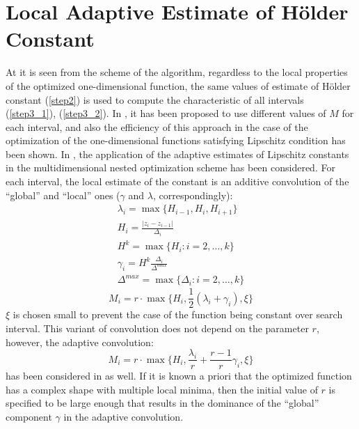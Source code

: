 \documentclass[procedia]{easychair}
\begin{document}
\section{Local Adaptive Estimate of Hölder Constant}
At it is seen from the scheme of the algorithm, regardless to the local properties
of the optimized one-dimensional function, the same values of estimate of Hölder
constant (\ref{step2}) is used to compute the characteristic of all intervals (\ref{step3_1}), (\ref{step3_2}).
In \cite{sergLocalTuning}, it has been proposed to use different values of \(M\) for each interval,
and also the efficiency of this approach in the case of the optimization of the
one-dimensional functions satisfying Lipschitz condition has been shown. In \cite{nestedLocal},
the application of the adaptive estimates of Lipschitz constants in the multidimensional
nested optimization scheme has been considered. For each interval, the local estimate of the
constant is an additive convolution of the ``global'' and ``local'' ones (\(\gamma\) and \(\lambda\), correspondingly):
\begin{displaymath}
  \begin{array}{lr}
    \lambda_i=\max\{H_{i-1},H_i,H_{i+1}\} \\
    H_i=\frac{|z_i-z_{i-1}|}{\Delta_i} \\
    H^k=\max\{H_i:i=2,\dots ,k\} \\
    \gamma_i=H^k\frac{\Delta_i}{\Delta^{max}} \\
    \Delta^{max}=\max\{\Delta_{i}:i=2,\dots ,k\}
  \end{array}
\end{displaymath}
\begin{equation}
\label{additiveConv}
M_i=r\cdot \max\{H_i, \frac{1}{2}(\lambda_i+\gamma_i),\xi\}
\end{equation}
\(\xi\) is chosen small to prevent the case of the function being constant over search interval.
This variant of convolution does not depend on the parameter \(r\), however, the adaptive convolution:
\begin{equation}
\label{additiveAdaptiveConv}
M_i=r\cdot \max\{H_i, \frac{\lambda_i}{r}+\frac{r-1}{r}\gamma_i,\xi\}
\end{equation}
has been considered in \cite{sergLocalTuning} as well.
If it is known a priori that the optimized function has a complex shape with multiple
local minima, then the initial value of \(r\) is specified to be large enough that
results in the dominance of the ``global'' component \(\gamma\) in the adaptive convolution.
\end{document}

